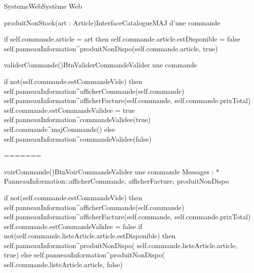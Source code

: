 \begin{OM}{SystemeWeb}{Système Web}
    \begin{OMOperation}{produitNonStock(art : Article)}{InterfaceCatalogue}{MAJ d'une commande}
        \begin{OMMessages}
        \end{OMMessages}
        \OMNoPre
        \begin{OMPost}
            if self.commande.article = art then
            self.commande.article.estDisponible = false
            self.panneauInformation^produitNonDispo(self.commande.article, true)
        \end{OMPost}
    \end{OMOperation}

    \begin{OMOperation}{validerCommande()}{BtnValiderCommande}{Valider une commande}
        \begin{OMMessages}
        \end{OMMessages}
        \OMNoPre
        \begin{OMPost}
            if not(self.commande.estCommandeVide) then
            self.panneauInformation^afficherCommande(self.commande)
            self.panneauInformation^afficherFacture(self.commande,
            self.commande.prixTotal)
            self.commande.estCommandeValidee = true
            self.panneauInformation^commandeValidee(true)
            self.commande^majCommande()
            else
            self.panneauInformation^commandeValidee(false)
        \end{OMPost}
    \end{OMOperation}
=======
\begin{OMOperation}{voirCommande()}{BtnVoirCommande}{Valider une commande}
Messages :
* PanneauInformation::{afficherCommande, afficherFacture, produitNonDispo}
\begin{OMPre}
\end{OMPre}
\begin{OMPost}
        if not(self.commande.estCommandeVide) then
                self.panneauInformation^afficherCommande(self.commande)
                self.panneauInformation^afficherFacture(self.commande, self.commande.prixTotal)
                self.commande.estCommandeValidee = false
                if not(self.commande.listeArticle.article.estDisponible) then
                        self.panneauInformation^produitNonDispo( self.commande.listeArticle.article, true)
                else
                        self.panneauInformation^produitNonDispo( self.commande.listeArticle.article, false)
                    \end{OMPost}
\end{OMOperation}


\end{OM}
